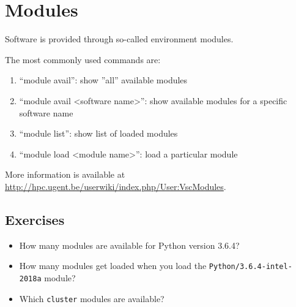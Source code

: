 \chapter{Modules}

Software is provided through so-called environment \gls{modules}.

The most commonly used commands are:

\begin{enumerate}
 \item ``module avail'': show ''all'' available modules
 \item ``module avail <software name>'': show available modules for a specific software name
 \item ``module list'': show list of loaded modules
 \item ``module load <module name>'': load a particular module
\end{enumerate}

More information is available at
\url{http://hpc.ugent.be/userwiki/index.php/User:VscModules}.

\section{Exercises}

\begin{itemize}
    \item How many modules are available for Python version 3.6.4?
    \item How many modules get loaded when you load the \lstinline|Python/3.6.4-intel-2018a|
        module?
    \item Which \lstinline|cluster| modules are available?
\end{itemize}
